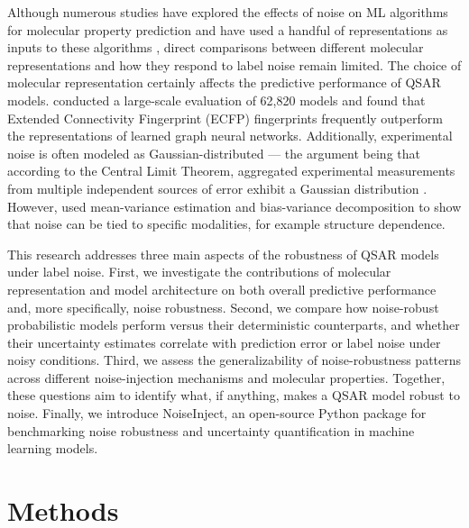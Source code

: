 \documentclass[pdflatex,sn-basic]{sn-jnl}%
\theoremstyle{thmstyleone}%
\theoremstyle{thmstyletwo}%
\theoremstyle{thmstylethree}%
\begin{document}
Although numerous studies have explored the effects of noise on ML algorithms for molecular property prediction and have used a handful of representations as inputs to these algorithms \citep{Kolmar2021}, direct comparisons between different molecular representations and how they respond to label noise remain limited. The choice of molecular representation certainly affects the predictive performance of QSAR models. \citet{Deng2023} conducted a large-scale evaluation of 62,820 models and found that Extended Connectivity Fingerprint (ECFP) fingerprints frequently outperform the representations of  learned graph neural networks. Additionally, experimental noise is often modeled as Gaussian-distributed --- the argument being that according to the Central Limit Theorem, aggregated experimental measurements from multiple independent sources of error exhibit a Gaussian distribution \citep{Kolmar2021}. However, \citet{Heid2023} used mean-variance estimation and bias-variance decomposition to show that noise can be tied to specific modalities, for example structure dependence. 

This research addresses three main aspects of the robustness of QSAR models under label noise. First, we investigate the contributions of molecular representation and model architecture on both overall predictive performance and, more specifically, noise robustness. Second, we compare how noise-robust probabilistic models perform versus their deterministic counterparts, and whether their uncertainty estimates correlate with prediction error or label noise under noisy conditions. Third, we assess the generalizability of noise-robustness patterns across different noise-injection mechanisms and molecular properties. Together, these questions aim to identify what, if anything, makes a QSAR model robust to noise. Finally, we introduce NoiseInject, an open-source Python package for benchmarking noise robustness and uncertainty quantification in machine learning models.

\section{Methods}\label{sec2}
\end{document}
